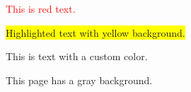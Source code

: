 \documentclass{article}
\begin{document}
\textcolor{red}{This is red text.}

\colorbox{yellow}{Highlighted text with yellow background.}

\textcolor{mycolor}{This is text with a custom color.}

\newpage %

\pagecolor{gray!20} %

This page has a gray background.
\end{document}
